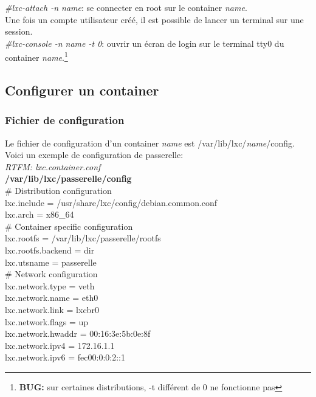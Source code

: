 \documentclass[twoside]{article}
\begin{document}
\emph{\#lxc-attach -n name}: se connecter en root sur le container \emph{name}.\\
Une fois un compte utilisateur cr\'e\'e, il est possible de lancer un terminal sur une session.\\

\emph{\#lxc-console -n name -t 0}: ouvrir un \'ecran de login sur le terminal tty0 du container \emph{name}.\footnote{\textbf{BUG:} sur certaines distributions, -t diff\'erent de 0 ne fonctionne pas}\\

\subsection{Configurer un container}
\subsubsection{Fichier de configuration}
Le fichier de configuration d'un container \emph{name} est /var/lib/lxc/\emph{name}/config. Voici un exemple de configuration de passerelle:\\
\emph{RTFM: lxc.container.conf}\\

\noindent
\textbf{/var/lib/lxc/passerelle/config}\\

\noindent
\# Distribution configuration\\
lxc.include = /usr/share/lxc/config/debian.common.conf\\
lxc.arch = x86\_64\\

\noindent
\# Container specific configuration\\
lxc.rootfs = /var/lib/lxc/passerelle/rootfs\\
lxc.rootfs.backend = dir\\
lxc.utsname = passerelle\\

\noindent
\# Network configuration\\
lxc.network.type = veth\\
lxc.network.name = eth0\\
lxc.network.link = lxcbr0\\
lxc.network.flags = up\\
lxc.network.hwaddr = 00:16:3e:5b:0e:8f\\
lxc.network.ipv4 = 172.16.1.1\\
lxc.network.ipv6 = fec00:0:0:2::1\\
\end{document}
